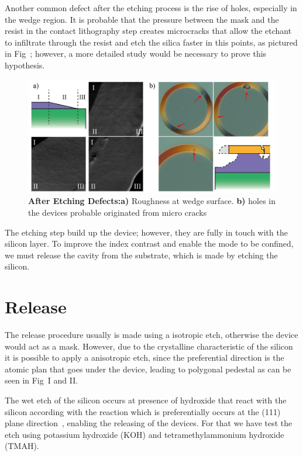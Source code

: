 Another common defect after the etching process is the rise of holes, especially in the wedge region. It is probable that the pressure between the mask and the resist in the contact lithography step creates microcracks that allow the etchant to infiltrate through the resist and etch the silica faster in this points, as pictured in Fig~; however, a more detailed study would be necessary to prove this hypothesis. 

\begin{figure}[!ht]
    \centering
    \includegraphics[width = 16cm]{figuras/Dissertation_etchin_def.jpg}
    \caption{\textbf{After Etching Defects:a)} Roughness at wedge surface. \textbf{b)} holes in the devices probable originated from micro cracks}
    \label{fig:ethc_wrong}
\end{figure}

The etching step build up the device; however, they are fully in touch with the silicon layer. To improve the index contrast and enable the mode to be confined, we must release the cavity from the substrate, which is made by etching the silicon.

\section{Release}

The release procedure usually is made using a isotropic etch, otherwise the device would act as a mask. However, due to the crystalline characteristic of the silicon it is possible to apply a anisotropic etch, since the preferential direction is the atomic plan that goes under the device, leading to polygonal pedestal as can be seen in Fig~I and II.

The wet etch of the silicon occurs at presence of hydroxide that react with the silicon according with the reaction
which is preferentially occurs at the (111) plane direction~\cite{Glembocki_1985}, enabling the releasing of the devices. For that we have test the etch using potassium hydroxide (KOH) and tetramethylammonium hydroxide (TMAH).

